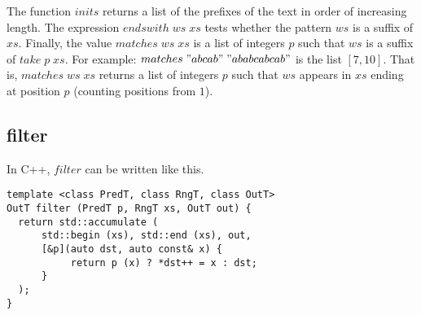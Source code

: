 \documentclass{article}
\begin{document}
The function \(inits\) returns a list of the prefixes of the text in
order of increasing length. The expression \(endswith\;ws\;xs\) tests
whether the pattern \(ws\) is a suffix of \(xs\). Finally, the value
\(matches\;ws\;xs\) is a list of integers \(p\) such that \(ws\) is a
suffix of \(take\; p\;xs\).  For example:
\(matches\;"abcab"\;"ababcabcab"\) is the list \([7, 10]\).  That is,
\(matches\;ws\;xs\) returns a list of integers \(p\) such that \(ws\)
appears in \(xs\) ending at position \(p\) (counting positions from
\(1\)).

\subsection{filter}
In C++, \(filter\) can be written like this.
\begin{verbatim}
template <class PredT, class RngT, class OutT>
OutT filter (PredT p, RngT xs, OutT out) {
  return std::accumulate (
      std::begin (xs), std::end (xs), out, 
      [&p](auto dst, auto const& x) { 
           return p (x) ? *dst++ = x : dst;
      }
  );
}
\end{verbatim}
\end{document}
